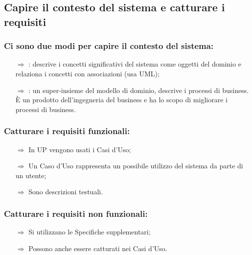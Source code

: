 
\subsection{Capire il contesto del sistema e catturare i requisiti}

\subsubsection{Ci sono due modi per capire il contesto del sistema:}

\begin{itemize}
    \item [$\Rightarrow$] : descrive i concetti significativi del sistema come oggetti del dominio e relaziona i concetti con associazioni (usa UML);
    \item [$\Rightarrow$] : un super-insieme del modello di dominio, descrive i processi di business. È un prodotto dell'ingegneria del business e ha lo scopo di migliorare i processi di business. 
\end{itemize}


\subsubsection{Catturare i requisiti funzionali:}

\begin{itemize}
    \item [$\Rightarrow$] In UP vengono usati i Casi d'Uso;
    \item [$\Rightarrow$] Un Caso d'Uso rappresenta un possibile utilizzo del sistema da parte di un utente;
    \item [$\Rightarrow$] Sono descrizioni testuali.
\end{itemize}

\subsubsection{Catturare i requisiti non funzionali:}

\begin{itemize}
    \item [$\Rightarrow$] Si utilizzano le Specifiche supplementari;
    \item [$\Rightarrow$] Possono anche essere catturati nei Casi d'Uso.
\end{itemize}


